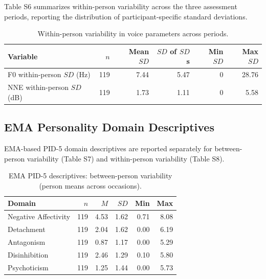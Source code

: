 \documentclass[
  english,
  man,floatsintext]{apa6}
\begin{document}
Table S6 summarizes within-person variability across the three assessment periods, reporting the distribution of participant-specific standard deviations.

\begin{table}

\caption{\label{tab:table-s5-voice-variability}Within-person variability in voice parameters across periods.}
\centering
\begin{tabular}[t]{lrrrrr}
\toprule
Variable & $n$ & Mean $SD$ & $SD$ of $SD$s & Min $SD$ & Max $SD$\\
\midrule
F0 within-person $SD$ (Hz) & 119 & 7.44 & 5.47 & 0 & 28.76\\
NNE within-person $SD$ (dB) & 119 & 1.73 & 1.11 & 0 & 5.58\\
\bottomrule
\end{tabular}
\end{table}

\subsection{EMA Personality Domain Descriptives}\label{ema-personality-domain-descriptives}

EMA-based PID-5 domain descriptives are reported separately for between-person variability (Table S7) and within-person variability (Table S8).

\begin{table}

\caption{\label{tab:table-s6-ema-between}EMA PID-5 descriptives: between-person variability (person means across occasions).}
\centering
\begin{tabular}[t]{lrrrrr}
\toprule
Domain & $n$ & $M$ & $SD$ & Min & Max\\
\midrule
Negative Affectivity & 119 & 4.53 & 1.62 & 0.71 & 8.08\\
Detachment & 119 & 2.04 & 1.62 & 0.00 & 6.19\\
Antagonism & 119 & 0.87 & 1.17 & 0.00 & 5.29\\
Disinhibition & 119 & 2.46 & 1.29 & 0.10 & 5.80\\
Psychoticism & 119 & 1.25 & 1.44 & 0.00 & 5.73\\
\bottomrule
\end{tabular}
\end{table}
\end{document}
